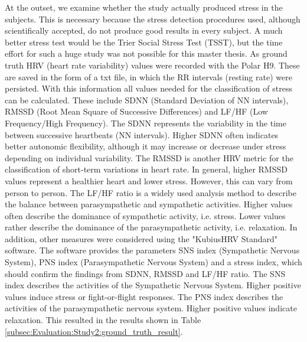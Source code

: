 At the outset, we examine whether the study actually produced stress in the subjects. 
This is necessary because the stress detection procedures used, although scientifically accepted, do not produce good results in every subject. 
A much better stress test would be the Trier Social Stress Test (TSST), but the time effort for such a huge study was not possible for this master thesis. 
As ground truth HRV (heart rate variability) values were recorded with the Polar H9.
These are saved in the form of a txt file, in which the RR intervals (resting rate) were persisted.
With this information all values needed for the classification of stress can be calculated.
These include SDNN (Standard Deviation of NN intervals), RMSSD (Root Mean Square of Successive Differences) and LF/HF (Low Frequency/High Frequency).
The SDNN represents the variability in the time between successive heartbeats (NN intervals). 
Higher SDNN often indicates better autonomic flexibility, although it may increase or decrease under stress depending on individual variability.
The RMSSD is another HRV metric for the classification of short-term variations in heart rate.
In general, higher RMSSD values represent a healthier heart and lower stress.
However, this can vary from person to person.
The LF/HF ratio is a widely used analysis method to describe the balance between parasympathetic and sympathetic activities. 
Higher values often describe the dominance of sympathetic activity, i.e. stress. 
Lower values rather describe the dominance of the parasympathetic activity, i.e. relaxation.
In addition, other measures were considered using the "KubiusHRV Standard" software.
The software provides the parameters SNS index (Sympathetic Nervous System), PNS index (Parasympathetic Nervous System) and a stress index, which should confirm the findings from SDNN, RMSSD and LF/HF ratio.
The SNS index describes the activities of the Sympathetic Nervous System. 
Higher positive values induce stress or fight-or-flight responses.
The PNS index describes the activities of the parasympathetic nervous system. 
Higher positive values indicate relaxation.
This resulted in the results shown in Table \ref{subsec:Evaluation:Study2:ground_truth_result}. 

